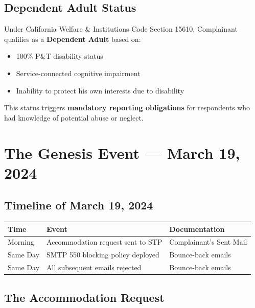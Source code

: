 \documentclass[12pt,letterpaper]{article}
\begin{document}
\subsection{Dependent Adult Status}

Under California Welfare \& Institutions Code Section 15610, Complainant qualifies as a \textbf{Dependent Adult} based on:
\begin{itemize}[noitemsep]
    \item 100\% P\&T disability status
    \item Service-connected cognitive impairment
    \item Inability to protect his own interests due to disability
\end{itemize}

This status triggers \textbf{mandatory reporting obligations} for respondents who had knowledge of potential abuse or neglect.

\newpage

\section{The Genesis Event --- March 19, 2024}

\subsection{Timeline of March 19, 2024}

\begin{center}
\begin{tabular}{lll}
\toprule
\textbf{Time} & \textbf{Event} & \textbf{Documentation} \\
\midrule
Morning & Accommodation request sent to STP & Complainant's Sent Mail \\
Same Day & SMTP 550 blocking policy deployed & Bounce-back emails \\
Same Day & All subsequent emails rejected & Bounce-back emails \\
\bottomrule
\end{tabular}
\end{center}

\subsection{The Accommodation Request}
\end{document}
